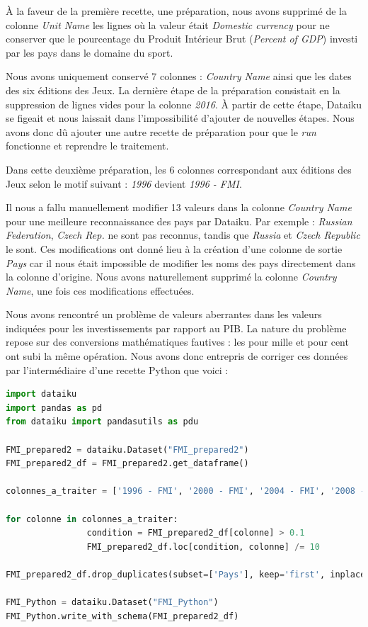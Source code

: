 \documentclass[hidelinks, 12pt]{article}
\begin{document}
À la faveur de la première recette, une préparation, nous avons supprimé de la colonne \emph{Unit Name} les lignes où la valeur était \emph{Domestic currency} pour ne conserver que le pourcentage du Produit Intérieur Brut (\emph{Percent of GDP}) investi par les pays dans le domaine du sport.

Nous avons uniquement conservé 7 colonnes : \emph{Country Name} ainsi que les dates des six éditions des Jeux. La dernière étape de la préparation consistait en la suppression de lignes vides pour la colonne \emph{2016}. À partir de cette étape, Dataiku se figeait et nous laissait dans l'impossibilité d'ajouter de nouvelles étapes. Nous avons donc dû ajouter une autre recette de préparation pour que le \emph{run} fonctionne et reprendre le traitement.

Dans cette deuxième préparation, les 6 colonnes correspondant aux éditions des Jeux selon le motif suivant : \emph{1996} devient \emph{1996 - FMI}. 

Il nous a fallu manuellement modifier 13 valeurs dans la colonne \emph{Country Name} pour une meilleure reconnaissance des pays par Dataiku. Par exemple : \emph{Russian Federation}, \emph{Czech Rep.} ne sont pas reconnus, tandis que \emph{Russia} et \emph{Czech Republic} le sont. Ces modifications ont donné lieu à la création d'une colonne de sortie \emph{Pays} car il nous était impossible de modifier les noms des pays directement dans la colonne d'origine. Nous avons naturellement supprimé la colonne \emph{Country Name}, une fois ces modifications effectuées. 

Nous avons rencontré un problème de valeurs aberrantes dans les valeurs indiquées pour les investissements par rapport au PIB. La nature du problème repose sur des conversions mathématiques fautives : les pour mille et pour cent ont subi la même opération. Nous avons donc entrepris de corriger ces données par l'intermédiaire d'une recette Python que voici :

\begin{lstlisting}[language=python]
import dataiku
import pandas as pd
from dataiku import pandasutils as pdu

FMI_prepared2 = dataiku.Dataset("FMI_prepared2")
FMI_prepared2_df = FMI_prepared2.get_dataframe()

colonnes_a_traiter = ['1996 - FMI', '2000 - FMI', '2004 - FMI', '2008 - FMI', '2012 - FMI', '2016 - FMI']

for colonne in colonnes_a_traiter:
				condition = FMI_prepared2_df[colonne] > 0.1
				FMI_prepared2_df.loc[condition, colonne] /= 10

FMI_prepared2_df.drop_duplicates(subset=['Pays'], keep='first', inplace=True)

FMI_Python = dataiku.Dataset("FMI_Python")
FMI_Python.write_with_schema(FMI_prepared2_df)
\end{lstlisting}
\end{document}
